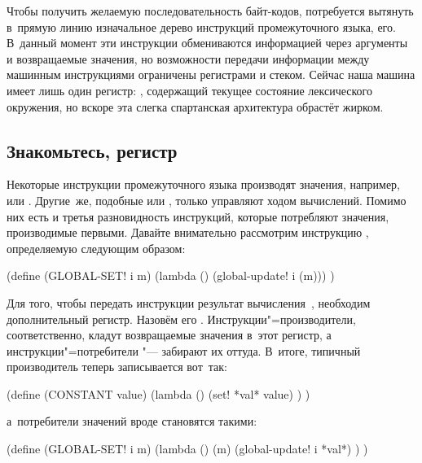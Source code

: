 Чтобы получить желаемую последовательность байт-кодов, потребуется вытянуть
в~прямую линию изначальное дерево инструкций промежуточного языка,
 его. В~данный момент эти инструкции обмениваются
информацией через аргументы и возвращаемые значения, но возможности передачи
информации между машинным инструкциями ограничены регистрами и стеком. Сейчас
наша машина имеет лишь один регистр: , содержащий текущее состояние
лексического окружения, но вскоре эта слегка спартанская архитектура обрастёт
жирком.


\subsection{\texorpdfstring{Знакомьтесь, регистр~\protect{}}%
{Знакомьтесь, регистр *val*}}%
\label{compilation/bytes/ssect:*val*}

Некоторые инструкции промежуточного языка производят значения, например,
 или . Другие~же, подобные 
или , только управляют ходом вычислений. Помимо них есть и
третья разновидность инструкций, которые потребляют значения, производимые
первыми. Давайте внимательно рассмотрим инструкцию ,
определяемую следующим образом:

\begin{code:lisp}
(define (GLOBAL-SET! i m)
  (lambda () (global-update! i (m))) )
\end{code:lisp}

Для того, чтобы передать инструкции  результат
вычисления~, необходим дополнительный регистр. Назовём его .
Инструкции"=производители, соответственно, кладут возвращаемые значения в~этот
регистр, а инструкции"=потребители "--- забирают их оттуда. В~итоге, типичный
производитель  теперь записывается вот~так:

\begin{code:lisp}
(define (CONSTANT value)
  (lambda ()
    (set! *val* value) ) )
\end{code:lisp}

\noindent
а~потребители значений вроде  становятся такими:

\begin{code:lisp}
(define (GLOBAL-SET! i m)
  (lambda ()
    (m)
    (global-update! i *val*) ) )
\end{code:lisp}

